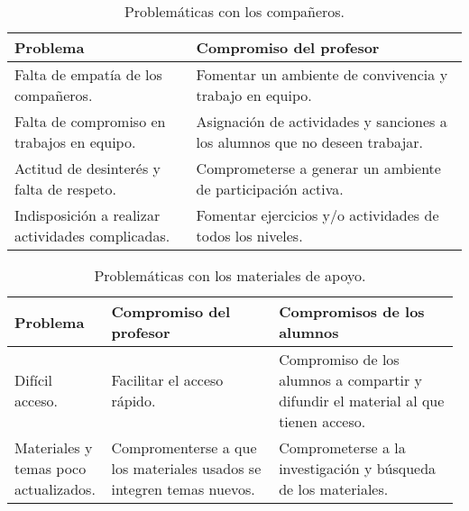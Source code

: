 \documentclass[12pt]{report}
\theoremstyle{largebreak}
\begin{document}
    \begin{table}[ht]
        \begin{center}
            \begin{tabular}{p{0.4\linewidth} | p{0.6\linewidth}}
                \hline
                \hline
                Problema & Compromiso del profesor \\
                \hline
                \hline
                Falta de empatía de los compañeros. & Fomentar un ambiente de convivencia y trabajo en equipo. \\
                \hline
                Falta de compromiso en trabajos en equipo. & Asignación de actividades y sanciones a los alumnos que no deseen trabajar.\\ 
                \hline
                Actitud de desinterés y falta de respeto. & Comprometerse a generar un ambiente de participación activa. \\
                \hline
                Indisposición a realizar actividades complicadas. & Fomentar ejercicios y/o actividades de todos los niveles. \\ 
                \hline
            \end{tabular}
            \caption{Problemáticas con los compañeros.}
        \end{center}
    \end{table}

    \begin{table}[h]
        \begin{center}
            \begin{tabular}{p{0.2\linewidth} | p{0.375\linewidth} | p{0.4\linewidth}}
                \hline
                \hline
                Problema & Compromiso del profesor & Compromisos de los alumnos \\
                \hline
                \hline
                Difícil acceso. & Facilitar el acceso rápido. & Compromiso de los alumnos a compartir y difundir el material al que tienen acceso. \\
                Materiales y temas poco actualizados. & Compromenterse a que los materiales usados se integren temas nuevos. & Comprometerse a la investigación y búsqueda de los materiales.\\
            \end{tabular}
            \caption{Problemáticas con los materiales de apoyo.}
        \end{center}
    \end{table}
\end{document}

